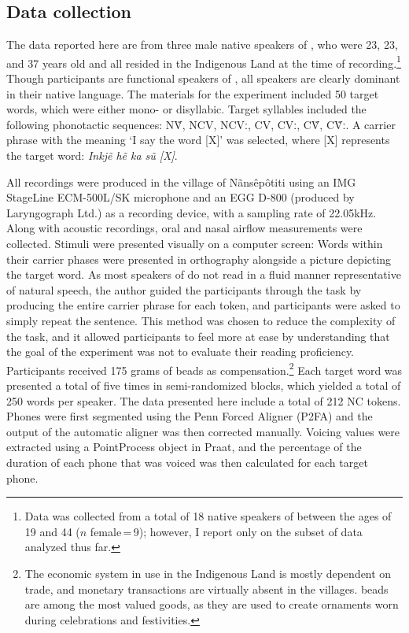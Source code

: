 \documentclass[output=paper,hidelinks]{langscibook}
\begin{document}
\subsection{Data collection}

The data reported here are from three male native speakers of , who were 23, 23, and 37 years old and all resided in the  Indigenous Land at the time of recording.\footnote{Data was collected from a total of 18 native speakers of  between the ages of 19 and 44 ($n$ female\,=\,9); however, I report only on the subset of data analyzed thus far.} Though participants are functional speakers of , all  speakers are clearly dominant in their native language. The materials for the experiment included 50 target words, which were either mono- or disyllabic. Target syllables included the following phonotactic sequences: N\~V, NCV, NCVː, CV, CVː, C\~V, C\~Vː. A carrier phrase with the meaning `I say the word [X]' was selected, where [X] represents the target word: \textit{Inkj\~e h\~e ka s\~u [X]}.

All recordings were produced in the village of N\~ans\^ep\^otiti using an IMG StageLine ECM-500L/SK microphone and an EGG D-800 (produced by Laryngograph Ltd.) as a recording device, with a sampling rate of 22.05kHz. Along with acoustic recordings, oral and nasal airflow measurements were collected. Stimuli were presented visually on a computer screen: Words within their carrier phases were presented in  orthography alongside a picture depicting the target word. As most speakers of  do not read in a fluid manner representative of natural speech, the author guided the participants through the task by producing the entire carrier phrase for each token, and participants were asked to simply repeat the sentence. This method was chosen to reduce the complexity of the task, and it allowed participants to feel more at ease by understanding that the goal of the experiment was not to evaluate their reading proficiency. Participants received 175 grams of  beads as compensation.\footnote{The economic system in use in the  Indigenous Land is mostly dependent on trade, and monetary transactions are virtually absent in the villages.  beads are among the most valued goods, as they are used to create ornaments worn during celebrations and festivities.} Each target word was presented a total of five times in semi-randomized blocks, which yielded a total of 250 words per speaker. The data presented here include a total of 212 NC tokens. Phones were first segmented using the Penn Forced Aligner (P2FA) and the output of the automatic aligner was then corrected manually. Voicing values were extracted using a PointProcess object in Praat, and the percentage of the duration of each phone that was voiced was then calculated for each target phone.
\end{document}
